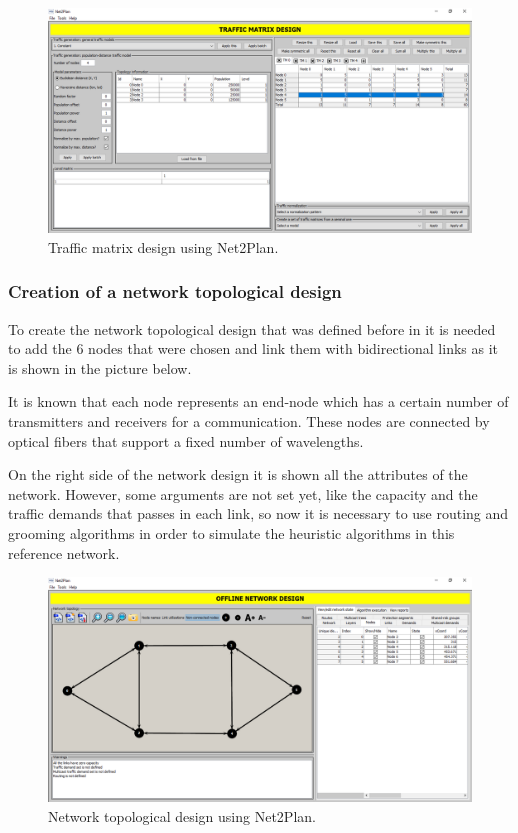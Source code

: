 \begin{figure}[h!]
\centering
\includegraphics[width=12cm]{sdf/heuristic/figures/traffic_matrix_design}
\caption{Traffic matrix design using Net2Plan.}
\label{traffic_matrix_design}
\end{figure}

\subsubsection{Creation of a network topological design}\label{creation_topological_design}

\vspace{11pt}
To create the network topological design that was defined before in \label{creation_traffic_matrices} it is needed to add the 6 nodes that were chosen and link them with bidirectional links as it is shown in the picture \label{network_topological_design} below.

It is known that each node represents an end-node which has a certain number of transmitters and receivers for a communication. These nodes are connected by optical fibers that support a fixed number of wavelengths.

On the right side of the network design it is shown all the attributes of the network. However, some arguments are not set yet, like the capacity and the traffic demands that passes in each link, so now it is necessary to use routing and grooming algorithms in order to simulate the heuristic algorithms in this reference network.

\begin{figure}[h!]
\centering
\includegraphics[width=12cm]{sdf/heuristic/figures/network_topological_design}
\caption{Network topological design using Net2Plan.}
\label{network_topological_design}
\end{figure}

